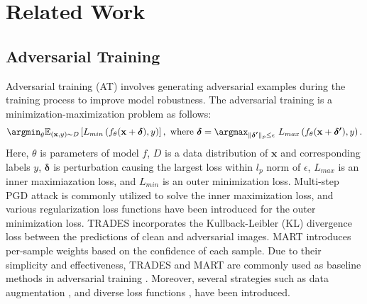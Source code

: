 \documentclass{article} %
\begin{document}

\section{Related Work}

\subsection{Adversarial Training}
Adversarial training (AT) involves generating adversarial examples during the training process to improve model robustness.
The adversarial training is a minimization-maximization problem as follows:
\begin{equation}\label{eq:basic_adv}
\begin{split}
    \argmin_{\theta}  \mathbb{E}_{(\mathbf{x}, y)\sim \mathit{D}}\left [    L_{min}\left (f_{\theta}(\mathbf{x}+\boldsymbol{\delta}), y \right ) \right  ], \ 
    \text{where} \ \boldsymbol{\delta} = \argmax_{ \| \boldsymbol{\delta'} \|_p \leq \epsilon}\ L_{max}\left (f_{\theta}(\mathbf{x}+\boldsymbol{\delta'}), y \right ).
\end{split}
\end{equation}
Here, $\theta$ is parameters of model $f$, $\mathit{D}$ is a data distribution of $\mathbf{x}$ and corresponding labels $y$, 
$\boldsymbol{\delta}$ is perturbation causing the largest loss within $l_p$ norm of $\epsilon$, $L_{max}$ is an inner maximiazation loss, and $L_{min}$ is an outer minimization loss.
Multi-step PGD attack \citep{PGD} is commonly utilized to solve the inner maximization loss, and various regularization loss functions have been introduced for the outer minimization loss.
TRADES \citep{TRADES} incorporates the Kullback-Leibler (KL) divergence loss between the predictions of clean and adversarial images.
MART\citep{MART} introduces per-sample weights based on the confidence of each sample.
Due to their simplicity and effectiveness, TRADES and MART are commonly used as baseline methods in adversarial training \citep{2020_awp,bai2021improving, jin2022enhancing, tack2022consistency, jin2023randomized,wei2023cfa, qin2019adversarial}. 
Moreover, several strategies such as data augmentation \citep{rebuffi2021fixing, li2023data}, and diverse loss functions \citep{2020_awp}, have been introduced. 
\end{document}
